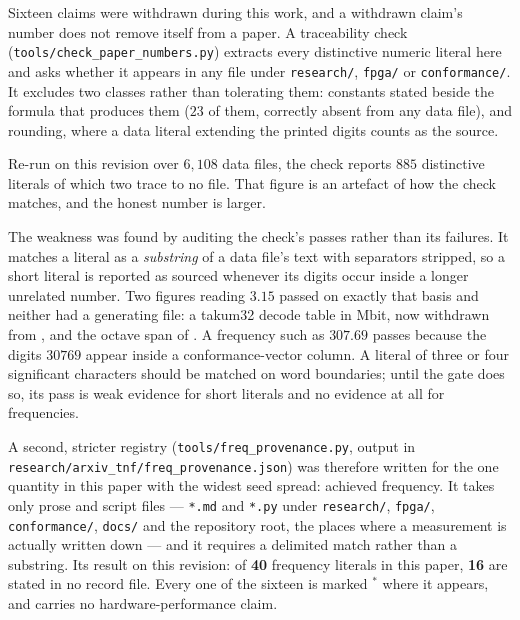 Sixteen claims were withdrawn during this work, and a withdrawn claim's number
does not remove itself from a paper. A traceability check
(\texttt{tools/\allowbreak check\_\allowbreak paper\_\allowbreak numbers.py}) extracts every distinctive numeric
literal here and asks whether it appears in any file under \texttt{research/},
\texttt{fpga/} or \texttt{conformance/}. It excludes two classes rather than
tolerating them: constants stated beside the formula that produces them ($23$ of
them, correctly absent from any data file), and rounding, where a data literal
extending the printed digits counts as the source.

Re-run on this revision over $6{,}108$ data files, the check reports $885$
distinctive literals of which two trace to no file. That figure is an artefact of
how the check matches, and the honest number is larger.

The weakness was found by auditing the check's passes rather than its failures. It
matches a literal as a \emph{substring} of a data file's text with separators
stripped, so a short literal is reported as sourced whenever its digits occur
inside a longer unrelated number. Two figures reading $3.15$ passed on exactly that
basis and neither had a generating file: a takum32 decode table in Mbit, now
withdrawn from , and the octave span of
. A frequency such as $307.69$ passes because the
digits $30769$ appear inside a conformance-vector column. A literal of three or
four significant characters should be matched on word boundaries; until the gate
does so, its pass is weak evidence for short literals and no evidence at all for
frequencies.

A second, stricter registry (\texttt{tools/}\allowbreak\texttt{freq\_provenance.py},
output in \texttt{research/}\allowbreak\texttt{arxiv\_tnf/}\allowbreak\texttt{freq\_provenance.json}) was therefore written for the
one quantity in this paper with the widest seed spread: achieved frequency. It
takes only prose and script files --- \texttt{*.md} and \texttt{*.py} under
\texttt{research/}, \texttt{fpga/}, \texttt{conformance/}, \texttt{docs/} and the
repository root, the places where a measurement is actually written down --- and it
requires a delimited match rather than a substring. Its result on this revision:
of \textbf{40} frequency literals in this paper, \textbf{16} are stated in no
record file. Every one of the sixteen is marked $^{\ast}$ where it appears, and
carries no hardware-performance claim.


